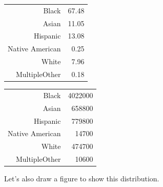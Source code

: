 \documentclass[12pt]{article}
\begin{document}
\begin{table}[htb]
\begin{minipage}{.45\textwidth}
\centering

\begin{tabular}{rr}
  Black & 67.48 \\ 
  Asian & 11.05 \\ 
  Hispanic & 13.08 \\ 
  Native American & 0.25 \\ 
  White & 7.96 \\ 
  MultipleOther & 0.18 \\ 
  \end{tabular}



\end{minipage}
\begin{minipage}{.45\textwidth}
\centering

\begin{tabular}{rr}
  Black & 4022000 \\ 
  Asian & 658800 \\ 
  Hispanic & 779800 \\ 
  Native American & 14700 \\ 
  White & 474700 \\ 
  MultipleOther & 10600 \\ 
  \end{tabular}



\end{minipage}
\end{table}

Let's also draw a figure to show this distribution.
\end{document}
